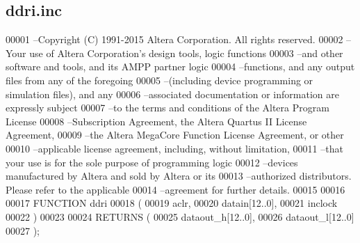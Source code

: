 \subsection{ddri.\+inc}
\label{ddri_8inc_source}

\begin{DoxyCode}
00001 --Copyright (C) 1991-2015 Altera Corporation. All rights reserved.
00002 --Your use of Altera Corporation\textcolor{stringliteral}{'s design tools, logic functions }
00003 \textcolor{stringliteral}{--and other software and tools, and its AMPP partner logic }
00004 \textcolor{stringliteral}{--functions, and any output files from any of the foregoing }
00005 \textcolor{stringliteral}{--(including device programming or simulation files), and any }
00006 \textcolor{stringliteral}{--associated documentation or information are expressly subject }
00007 \textcolor{stringliteral}{--to the terms and conditions of the Altera Program License }
00008 \textcolor{stringliteral}{--Subscription Agreement, the Altera Quartus II License Agreement,}
00009 \textcolor{stringliteral}{--the Altera MegaCore Function License Agreement, or other }
00010 \textcolor{stringliteral}{--applicable license agreement, including, without limitation, }
00011 \textcolor{stringliteral}{--that your use is for the sole purpose of programming logic }
00012 \textcolor{stringliteral}{--devices manufactured by Altera and sold by Altera or its }
00013 \textcolor{stringliteral}{--authorized distributors.  Please refer to the applicable }
00014 \textcolor{stringliteral}{--agreement for further details.}
00015 \textcolor{stringliteral}{}
00016 \textcolor{stringliteral}{}
00017 \textcolor{stringliteral}{FUNCTION ddri }
00018 \textcolor{stringliteral}{(}
00019 \textcolor{stringliteral}{    aclr,}
00020 \textcolor{stringliteral}{    datain[12..0],}
00021 \textcolor{stringliteral}{    inclock}
00022 \textcolor{stringliteral}{)}
00023 \textcolor{stringliteral}{}
00024 \textcolor{stringliteral}{RETURNS (}
00025 \textcolor{stringliteral}{    dataout\_h[12..0],}
00026 \textcolor{stringliteral}{    dataout\_l[12..0]}
00027 \textcolor{stringliteral}{);}
\end{DoxyCode}
